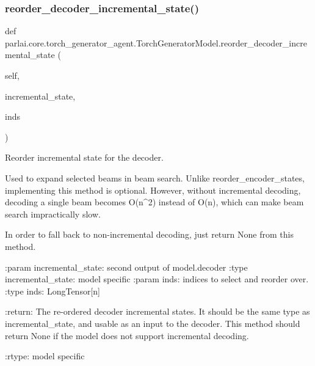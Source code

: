 \subsubsection{\texorpdfstring{reorder\+\_\+decoder\+\_\+incremental\+\_\+state()}{reorder\_decoder\_incremental\_state()}}
{\footnotesize\ttfamily def parlai.\+core.\+torch\+\_\+generator\+\_\+agent.\+Torch\+Generator\+Model.\+reorder\+\_\+decoder\+\_\+incremental\+\_\+state (\begin{DoxyParamCaption}\item[{}]{self,  }\item[{}]{incremental\+\_\+state,  }\item[{}]{inds }\end{DoxyParamCaption})}

\begin{DoxyVerb}Reorder incremental state for the decoder.

Used to expand selected beams in beam search. Unlike reorder_encoder_states,
implementing this method is optional. However, without incremental decoding,
decoding a single beam becomes O(n^2) instead of O(n), which can make
beam search impractically slow.

In order to fall back to non-incremental decoding, just return None from this
method.

:param incremental_state:
    second output of model.decoder
:type incremental_state:
    model specific
:param inds:
    indices to select and reorder over.
:type inds:
    LongTensor[n]

:return:
    The re-ordered decoder incremental states. It should be the same
    type as incremental_state, and usable as an input to the decoder.
    This method should return None if the model does not support
    incremental decoding.

:rtype:
    model specific
\end{DoxyVerb}
 \mbox{\label{classparlai_1_1core_1_1torch__generator__agent_1_1TorchGeneratorModel_a9ed5aecabe977856b4c385ba74fa6107}} 
